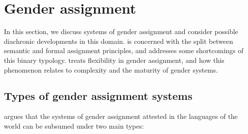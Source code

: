 \documentclass[output=collectionpaper]{langsci/langscibook}
\begin{document}
\section{Gender assignment}
\label{sec:WDG:5}

In this section, we discuss systems of gender assignment and consider possible diachronic developments in this domain.  is concerned with the split between semantic and formal assignment principles, and addresses some shortcomings of this binary typology.  treats flexibility in gender assignment, and how this phenomenon relates to complexity and the maturity of gender systems.

  \subsection{Types of gender assignment systems}
\label{sec:WDG:5.1}

\cite{Corbett2013b} argues that the systems of gender assignment attested in the languages of the world can be subsumed under two main types:
\end{document}
